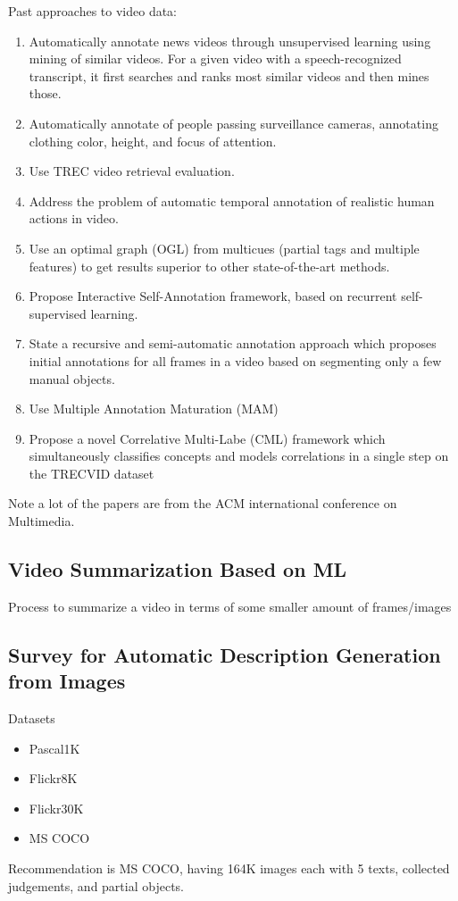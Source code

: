 \documentclass[conference]{IEEEtran}
\begin{document}
Past approaches to video data:
\begin{enumerate}
    \item Automatically annotate news videos through unsupervised learning using mining of similar videos. For a given video with a speech-recognized transcript, it first searches and ranks most similar videos and then mines those.
    \item Automatically annotate of people passing surveillance cameras, annotating clothing color, height, and focus of attention.
    \item Use TREC video retrieval evaluation.
    \item Address the problem of automatic temporal annotation of realistic human actions in video.
    \item Use an optimal graph (OGL) from multicues (partial tags and multiple features) to get results superior to other state-of-the-art methods.
    \item Propose Interactive Self-Annotation framework, based on recurrent self-supervised learning.
    \item State a recursive and semi-automatic annotation approach which proposes initial annotations for all frames in a video based on segmenting only a few manual objects.
    \item Use Multiple Annotation Maturation (MAM)
    \item Propose a novel Correlative Multi-Labe (CML) framework which simultaneously classifies concepts and models correlations in a single step on the TRECVID dataset
\end{enumerate}
\cite{DBLP:journals/corr/abs-2109-03784}

Note a lot of the papers are from the ACM international conference on Multimedia.

\subsection{Video Summarization Based on ML}
Process to summarize a video in terms of some smaller amount of frames/images \cite{4604096}

\subsection{Survey for Automatic Description Generation from Images}
Datasets
\begin{itemize}
    \item Pascal1K
    \item Flickr8K
    \item Flickr30K
    \item MS COCO
\end{itemize}
Recommendation is MS COCO, having 164K images each with 5 texts, collected judgements, and partial objects.
\end{document}
